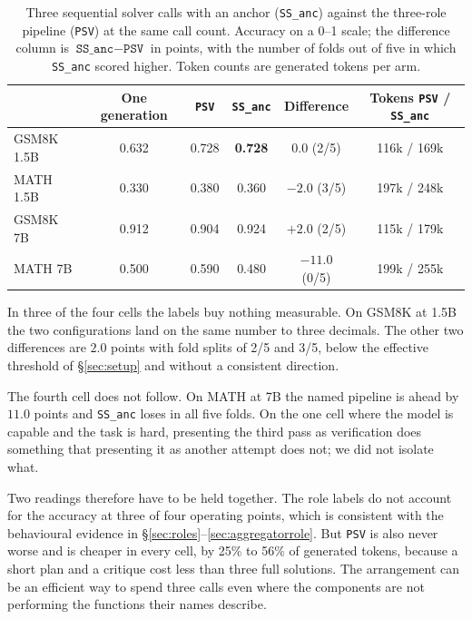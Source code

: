 \documentclass[11pt,a4paper]{article}
\begin{document}
\begin{table}[h]\centering\small
\begin{tabular}{@{}l c c c c c@{}}
\toprule
 & One generation & \texttt{PSV} & \texttt{SS\_anc} & Difference & Tokens \texttt{PSV} / \texttt{SS\_anc}\\
\midrule
GSM8K 1.5B & 0.632 & 0.728 & \textbf{0.728} & $0.0$ (2/5) & 116k / 169k\\
MATH 1.5B  & 0.330 & 0.380 & 0.360 & $-2.0$ (3/5) & 197k / 248k\\
GSM8K 7B   & 0.912 & 0.904 & 0.924 & $+2.0$ (2/5) & 115k / 179k\\
MATH 7B    & 0.500 & 0.590 & 0.480 & $\mathbf{-11.0}$ (0/5) & 199k / 255k\\
\bottomrule
\end{tabular}
\caption{Three sequential solver calls with an anchor (\texttt{SS\_anc}) against the three-role
pipeline (\texttt{PSV}) at the same call count. Accuracy on a 0--1 scale; the difference column is
$\texttt{SS\_anc}-\texttt{PSV}$ in points, with the number of folds out of five in which
\texttt{SS\_anc} scored higher. Token counts are generated tokens per arm.}
\label{tab:anchor}
\end{table}

In three of the four cells the labels buy nothing measurable. On GSM8K at 1.5B the two
configurations land on the same number to three decimals. The other two differences are $2.0$
points with fold splits of 2/5 and 3/5, below the effective threshold of \S\ref{sec:setup} and
without a consistent direction.

The fourth cell does not follow. On MATH at 7B the named pipeline is ahead by $11.0$ points and
\texttt{SS\_anc} loses in all five folds. On the one cell where the model is capable and the task
is hard, presenting the third pass as verification does something that presenting it as another
attempt does not; we did not isolate what.

Two readings therefore have to be held together. The role labels do not account for the accuracy
at three of four operating points, which is consistent with the behavioural evidence in
\S\ref{sec:roles}--\ref{sec:aggregatorrole}. But \texttt{PSV} is also never worse and is cheaper
in every cell, by 25\% to 56\% of generated tokens, because a short plan and a critique cost less
than three full solutions. The arrangement can be an efficient way to spend three calls even
where the components are not performing the functions their names describe.
\end{document}

